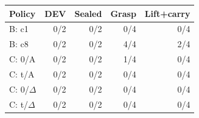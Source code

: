 \begin{tabular}{lrrrr}\hline Policy & DEV & Sealed & Grasp & Lift+carry\\\hline
B: c1 & 0/2 & 0/2 & 0/4 & 0/4 \\
B: c8 & 0/2 & 0/2 & 4/4 & 2/4 \\
C: 0/A & 0/2 & 0/2 & 1/4 & 0/4 \\
C: t/A & 0/2 & 0/2 & 0/4 & 0/4 \\
C: 0/$\Delta$ & 0/2 & 0/2 & 0/4 & 0/4 \\
C: t/$\Delta$ & 0/2 & 0/2 & 0/4 & 0/4 \\
\hline\end{tabular}
